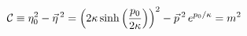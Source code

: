 \begin{equation}\label{24a}
  {\cal C} \equiv \eta_0^2 - \vec{\eta}\, {}^2 = \left(2\kappa \sinh \left(\frac{p_0}{2\kappa}\right)\right)^2 -
\vec{p}\,{}^2\, e^{p_0/\kappa}= m^2
\end{equation}

